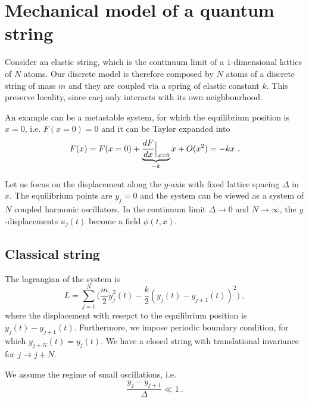 \chapter{Mechanical model of a quantum string}

    Consider an elastic string, which is the continuum limit of a $1$-dimensional lattics of $N$ atoms. Our discrete model is therefore composed by $N$ atoms of a discrete string of mass $m$ and they are coupled via a spring of elastic constant $k$. This preserve locality, since eacj only interacts with its own neighbourhood. 

    An example can be a metastable system, for which the equilibrium position is $x = 0$, i.e. $F(x = 0) = 0$ and it can be Taylor expanded into 
    \begin{equation}
        F(x) = F(x = 0) + \underbrace{\frac{dF}{dx} \Big \vert_{x = 0}}_{-k} x + O(x^2) = - k x ~.
    \end{equation}

    Let us focus on the displacement along the $y$-axis with fixed lattice spacing $\Delta$ in $x$. The equilibrium points are $y_j = 0$ and the system can be viewed as a system of $N$ coupled harmonic oscillators. In the continuum limit $\Delta \rightarrow 0$ and $ N \rightarrow \infty$, the $y$-displacements $u_j (t)$ become a field $\phi(t, x)$.

\section{Classical string}

    The lagrangian of the system is 
    \begin{equation*}
        L = \sum_{j = 1}^{N} \Big ( \frac{m}{2} \dot y_j^2 (t) - \frac{k}{2} (y_j(t) - y_{j+1} (t) )^2 \Big) ~,
    \end{equation*}
    where the displacement with resepct to the equilibrium position is $y_j(t) - y_{j+1} (t)$. Furthermore, we impose periodic boundary condition, for which $y_{j + N} (t) = y_{j} (t)$. We have a closed string with translational invariance for $j \rightarrow j + N$.

    We assume the regime of small oscillations, i.e. 
    \begin{equation*}
        \frac{y_j - y_{j+1}}{\Delta} \ll 1 ~.
    \end{equation*}

